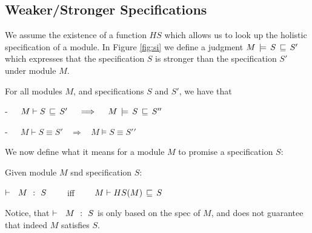 \subsection{Weaker/Stronger Specifications}

We assume   the existence of a function $HS$ which allows us to look up the holistic specification of a module. 
In Figure \ref{fig:si} we   define a judgment $M\, \models\, S\, \sqsubseteq\, S'$ which expresses that the specification $S$ is stronger than the specification $S'$ under module $M$.  


\begin{lemma}
For all modules $M$, and specifications $S$ and $S'$, we have that\\
\strut \hspace{2cm}-\ \ \  $\strongerI M  S  {S'}    \ \ \ \ \Longrightarrow\ \ \ \ \stronger M S {S'}'$\\
\strut \hspace{2cm}-\ \ \  $M \vdash S \equiv S'    \ \ \ \ \Longrightarrow\ \ \ \ M \models S \equiv {S'}'$
\end{lemma}

We now define what it means for a module $M$ to promise a specification $S$:

\begin{definition}
Given module $M$ snd specification $S$:

\strut \hspace{2cm} ${\vdash \ \ M\ \ \mathbf{:}\ \ S}$ \ \ \ \  iff \ \ \ \  $M \vdash HS(M)\, \sqsubseteq\, S$
\end{definition}

Notice, that ${\vdash \ \ M\ \ \mathbf{:}\ \ S}$ is only based on the spec of $M$, and does not guarantee that indeed $M$ satisfies $S$.

% 
%
%
%
 


